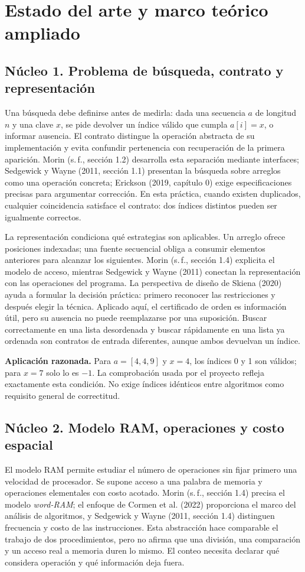\section{Estado del arte y marco teórico ampliado}
\subsection{Núcleo 1. Problema de búsqueda, contrato y representación}
Una búsqueda debe definirse antes de medirla: dada una secuencia $a$ de longitud $n$ y una clave $x$, se pide devolver un índice válido que cumpla $a[i]=x$, o informar ausencia. El contrato distingue la operación abstracta de su implementación y evita confundir pertenencia con recuperación de la primera aparición. Morin (s.\,f., sección 1.2) desarrolla esta separación mediante interfaces; Sedgewick y Wayne (2011, sección 1.1) presentan la búsqueda sobre arreglos como una operación concreta; Erickson (2019, capítulo 0) exige especificaciones precisas para argumentar corrección. En esta práctica, cuando existen duplicados, cualquier coincidencia satisface el contrato: dos índices distintos pueden ser igualmente correctos.

La representación condiciona qué estrategias son aplicables. Un arreglo ofrece posiciones indexadas; una fuente secuencial obliga a consumir elementos anteriores para alcanzar los siguientes. Morin (s.\,f., sección 1.4) explicita el modelo de acceso, mientras Sedgewick y Wayne (2011) conectan la representación con las operaciones del programa. La perspectiva de diseño de Skiena (2020) ayuda a formular la decisión práctica: primero reconocer las restricciones y después elegir la técnica. Aplicado aquí, el certificado de orden es información útil, pero su ausencia no puede reemplazarse por una suposición. Buscar correctamente en una lista desordenada y buscar rápidamente en una lista ya ordenada son contratos de entrada diferentes, aunque ambos devuelvan un índice.

\textbf{Aplicación razonada.} Para $a=[4,4,9]$ y $x=4$, los índices 0 y 1 son válidos; para $x=7$ solo lo es $-1$. La comprobación usada por el proyecto refleja exactamente esta condición. No exige índices idénticos entre algoritmos como requisito general de correctitud.

\subsection{Núcleo 2. Modelo RAM, operaciones y costo espacial}
El modelo RAM permite estudiar el número de operaciones sin fijar primero una velocidad de procesador. Se supone acceso a una palabra de memoria y operaciones elementales con costo acotado. Morin (s.\,f., sección 1.4) precisa el modelo \emph{word-RAM}; el enfoque de Cormen et al. (2022) proporciona el marco del análisis de algoritmos, y Sedgewick y Wayne (2011, sección 1.4) distinguen frecuencia y costo de las instrucciones. Esta abstracción hace comparable el trabajo de dos procedimientos, pero no afirma que una división, una comparación y un acceso real a memoria duren lo mismo. El conteo necesita declarar qué considera operación y qué información deja fuera.

